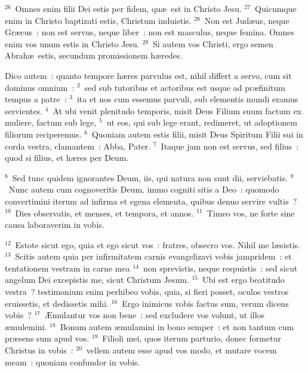 ${}^{26}$~Omnes enim filii Dei estis per fidem, qu\ae\ est in Christo Jesu.
${}^{27}$~Quicumque enim in Christo baptizati estis, Christum induistis.
${}^{28}$~Non est Jud\ae us, neque Gr\ae cus~: non est servus, neque liber~: non est masculus, neque femina. Omnes enim vos unum estis in Christo Jesu.
${}^{29}$~Si autem vos Christi, ergo semen Abrah\ae\ estis, secundum promissionem h\ae redes.

\lettrine[lines=10,image=true,loversize=0.05,lraise=-0.03]{D}{}ico autem~: quanto tempore h\ae res parvulus est, nihil differt a servo, cum sit dominus omnium~:
${}^{2}$~sed sub tutoribus et actoribus est usque ad pr\ae finitum tempus a patre~:
${}^{3}$~ita et nos cum essemus parvuli, sub elementis mundi eramus servientes.
${}^{4}$~At ubi venit plenitudo temporis, misit Deus Filium suum factum ex muliere, factum sub lege,
${}^{5}$~ut eos, qui sub lege erant, redimeret, ut adoptionem filiorum reciperemus.
${}^{6}$~Quoniam autem estis filii, misit Deus Spiritum Filii sui in corda vestra, clamantem~: Abba, Pater.
${}^{7}$~Itaque jam non est servus, sed filius~: quod si filius, et h\ae res per Deum.


${}^{8}$~Sed tunc quidem ignorantes Deum, iis, qui natura non sunt dii, serviebatis.
${}^{9}$~Nunc autem cum cognoveritis Deum, immo cogniti sitis a Deo~: quomodo convertimini iterum ad infirma et egena elementa, quibus denuo servire vultis~?
${}^{10}$~Dies observatis, et menses, et tempora, et annos.
${}^{11}$~Timeo vos, ne forte sine causa laboraverim in vobis.


${}^{12}$~Estote sicut ego, quia et ego sicut vos~: fratres, obsecro vos. Nihil me l\ae sistis.
${}^{13}$~Scitis autem quia per infirmitatem carnis evangelizavi vobis jampridem~: et tentationem vestram in carne mea
${}^{14}$~non sprevistis, neque respuistis~: sed sicut angelum Dei excepistis me, sicut Christum Jesum.
${}^{15}$~Ubi est ergo beatitudo vestra~? testimonium enim perhibeo vobis, quia, si fieri posset, oculos vestros eruissetis, et dedissetis mihi.
${}^{16}$~Ergo inimicus vobis factus sum, verum dicens vobis~?
${}^{17}$~\AE mulantur vos non bene~: sed excludere vos volunt, ut illos \ae mulemini.
${}^{18}$~Bonum autem \ae mulamini in bono semper~: et non tantum cum pr\ae sens sum apud vos.
${}^{19}$~Filioli mei, quos iterum parturio, donec formetur Christus in vobis~:
${}^{20}$~vellem autem esse apud vos modo, et mutare vocem meam~: quoniam confundor in vobis.



